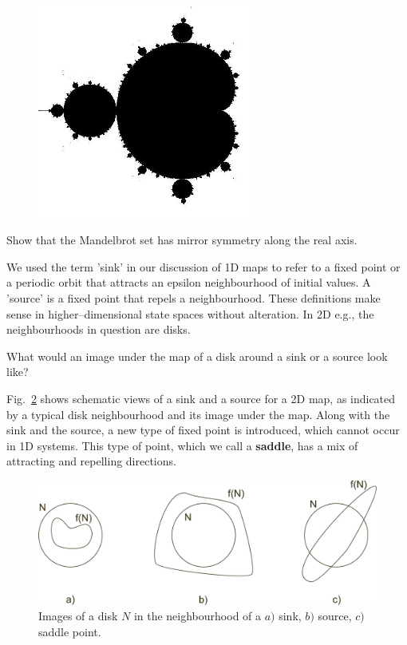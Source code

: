 \begin{figure}
\centering
\includegraphics[width=7cm]{dynamic/figures/mandelbrot}
\label{fig-mandelbrot}
\end{figure} 


\begin{exer}
Show that the Mandelbrot set has mirror symmetry along the real axis.
\end{exer}

\pagebreak


We used the term 'sink' in our discussion of 1D maps to refer to a fixed point or a periodic orbit that attracts an epsilon neighbourhood of initial values. A 'source' is a fixed point that repels a neighbourhood. These definitions make sense in higher--dimensional state spaces without alteration. In 2D e.g., the neighbourhoods in question are disks.

\begin{cue}
What would an image under the map of a disk around a sink or a source look like?  
\end{cue}

Fig.~\ref{fig-circle-images} shows schematic views of a sink and a source for a 2D map, as indicated by a typical disk neighbourhood and its image under the map. Along with the sink and the source, a new type of fixed point is introduced, which cannot occur in 1D systems. This type of point, which we call a \textbf{saddle}, has a mix of attracting and repelling directions.

\begin{figure}[h]
\centering
\includegraphics{dynamic/figures/circle_images}
\caption{Images of a disk $N$ in the neighbourhood of a $a)$ sink, $b)$ source, $c)$ saddle point.}
\label{fig-circle-images}
\end{figure} 


